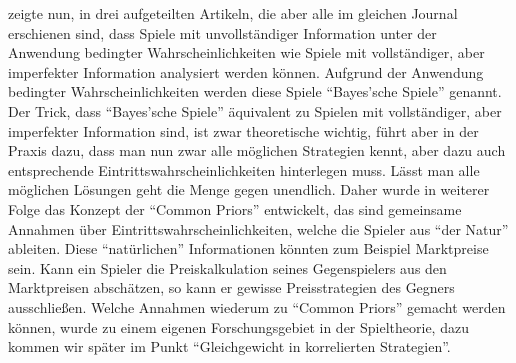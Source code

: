 \textcite{Harsanyi1967} zeigte nun, in drei aufgeteilten Artikeln, die aber alle im gleichen Journal erschienen sind, dass Spiele mit unvollständiger Information unter der Anwendung bedingter Wahrscheinlichkeiten wie Spiele mit vollständiger, aber imperfekter Information analysiert werden können. Aufgrund der Anwendung bedingter Wahrscheinlichkeiten werden diese Spiele "`Bayes'sche Spiele"' genannt. Der Trick, dass "`Bayes'sche Spiele"' äquivalent zu Spielen mit vollständiger, aber imperfekter Information sind, ist zwar theoretische wichtig, führt aber in der Praxis dazu, dass man nun zwar alle möglichen Strategien kennt, aber dazu auch entsprechende Eintrittswahrscheinlichkeiten hinterlegen muss. Lässt man alle möglichen Lösungen geht die Menge gegen unendlich. Daher wurde in weiterer Folge das Konzept der "`Common Priors"' entwickelt, das sind gemeinsame Annahmen über Eintrittswahrscheinlichkeiten, welche die Spieler aus "`der Natur"' ableiten. Diese "`natürlichen"' Informationen könnten zum Beispiel Marktpreise sein. Kann ein Spieler die Preiskalkulation seines Gegenspielers aus den Marktpreisen abschätzen, so kann er gewisse Preisstrategien des Gegners ausschließen. Welche Annahmen wiederum zu "`Common Priors"' gemacht werden können, wurde zu einem eigenen Forschungsgebiet in der Spieltheorie, dazu kommen wir später im Punkt "`Gleichgewicht in korrelierten Strategien"'.

